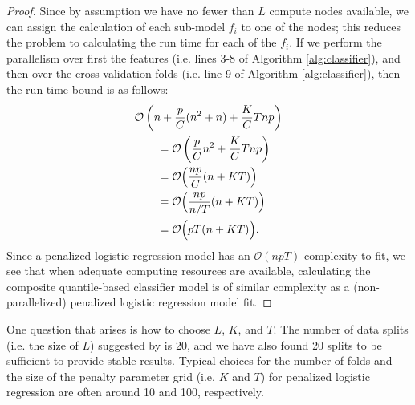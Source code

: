 \begin{proof}
  Since by assumption we have no fewer than $L$ compute nodes available, we can
  assign the calculation of each sub-model $f_i$ to one of the nodes; this
  reduces the problem to calculating the run time for each of the $f_i$.  If we
  perform the parallelism over first the features (i.e. lines 3-8 of Algorithm
  \ref{alg:classifier}), and then over the cross-validation folds (i.e. line 9
  of Algorithm \ref{alg:classifier}), then the run time bound is as follows:
  \begin{align}
    \label{eq:classifier-runtime-parallel}
    \begin{split} \MoveEqLeft
      \mathcal{O}\left( n + \frac{p}{C} (n^2 + n) + \frac{K}{C} Tnp \right) \\
      &= \mathcal{O}\left( \frac{p}{C} n^2 + \frac{K}{C} Tnp \right) \\
      &= \mathcal{O}\Big( \frac{np}{C} (n + KT) \Big) \\
      &= \mathcal{O}\Big( \frac{np}{n/T} (n + KT) \Big) \\
      &= \mathcal{O}\Big( pT (n + KT) \Big).
    \end{split}
  \end{align}
  Since a penalized logistic regression model has an $\mathcal{O}(npT)$
  complexity to fit, we see that when adequate computing resources are
  available, calculating the composite quantile-based classifier model is of
  similar complexity as a (non-parallelized) penalized logistic regression model
  fit.
\end{proof}

One question that arises is how to choose $L$, $K$, and $T$.  The number of data
splits (i.e. the size of $L$) suggested by \cite{fan2016} is 20, and we have
also found 20 splits to be sufficient to provide stable results.  Typical
choices for the number of folds and the size of the penalty parameter grid
(i.e. $K$ and $T$) for penalized logistic regression are often around 10 and
100, respectively.




